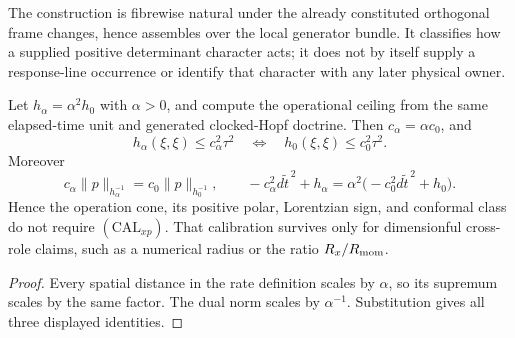 \documentclass[12pt,a4paper]{article}
\begin{document}
\begin{remark}
\label{p3a:rem:determinant-root-bundle-scope}
The construction is fibrewise natural under the already constituted
orthogonal frame changes, hence assembles over the local generator bundle.
It classifies how a supplied positive determinant character acts; it does not
by itself supply a response-line occurrence or identify that character with
any later physical owner.
\end{remark}

\begin{lemma}
\label{p3a:lem:causal-homothety}
Let \(h_\alpha=\alpha^2h_0\) with \(\alpha>0\), and compute the operational
ceiling from the same elapsed-time unit and generated clocked-Hopf doctrine.  Then
\(c_\alpha=\alpha c_0\), and
\[
 h_\alpha(\xi,\xi)\le c_\alpha^2\tau^2
 \quad\Longleftrightarrow\quad
 h_0(\xi,\xi)\le c_0^2\tau^2.
\]
Moreover
\[
 c_\alpha\|p\|_{h_\alpha^{-1}}
 =c_0\|p\|_{h_0^{-1}},
 \qquad
 -c_\alpha^2d\widetilde t^{\,2}+h_\alpha
 =\alpha^2\bigl(-c_0^2d\widetilde t^{\,2}+h_0\bigr).
\]
Hence the operation cone, its positive polar, Lorentzian sign, and conformal
class do not require \((\mathrm{CAL}_{xp})\).  That calibration survives only
for dimensionful cross-role claims, such as a numerical radius or the ratio
\(R_x/R_{\mathrm{mom}}\).
\end{lemma}

\begin{proof}
Every spatial distance in the rate definition scales by \(\alpha\), so its
supremum scales by the same factor.  The dual norm scales by
\(\alpha^{-1}\).  Substitution gives all three displayed identities.
\end{proof}
\end{document}
